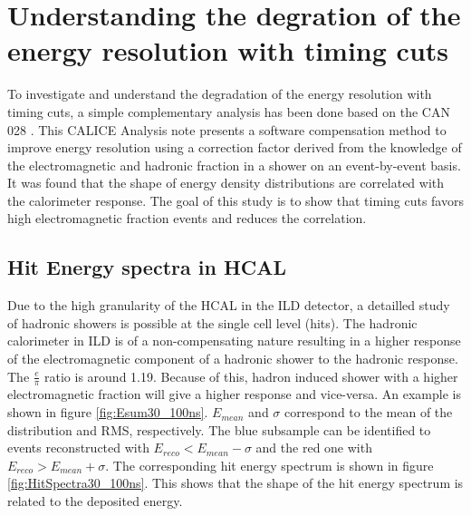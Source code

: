 \chapter{Understanding the degration of the energy resolution with timing cuts}
\label{appendix:eresdegrad}

To investigate and understand the degradation of the energy resolution with timing cuts, a simple complementary analysis has been done based on the CAN 028 \cite{}. This CALICE Analysis note presents a software compensation method to improve energy resolution using a correction factor derived from the knowledge of the electromagnetic and hadronic fraction in a shower on an event-by-event basis. It was found that the shape of energy density distributions are correlated with the calorimeter response. The goal of this study is to show that timing cuts favors high electromagnetic fraction events and reduces the correlation.

\section{Hit Energy spectra in HCAL}

Due to the high granularity of the HCAL in the ILD detector, a detailled study of hadronic showers is possible at the single cell level (hits). The hadronic calorimeter in ILD is of a non-compensating nature resulting in a higher response of the electromagnetic component of a hadronic shower to the hadronic response. The $\frac{e}{\pi}$ ratio is around 1.19. Because of this, hadron induced shower with a higher electromagnetic fraction will give a higher response and vice-versa. An example is shown in figure \ref{fig:Esum30_100ns}. $E_{mean}$ and $\sigma$ correspond to the mean of the distribution and RMS, respectively. The blue subsample can be identified to events reconstructed with $E_{reco} < E_{mean} - \sigma$ and the red one with $E_{reco} > E_{mean} + \sigma$. The corresponding hit energy spectrum is shown in figure \ref{fig:HitSpectra30_100ns}. This shows that the shape of the hit energy spectrum is related to the deposited energy.

